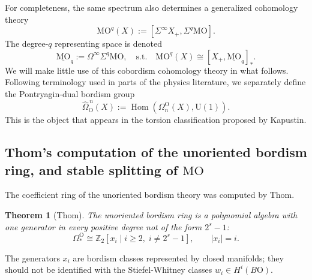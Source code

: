 \documentclass[aps,prx,reprint,superscriptaddress,twocolumn,amsmath,amssymb,amsfonts, nofootinbib]{revtex4-2}
\theoremstyle{apsstyle}
\newtheorem{theorem}{Theorem}[section]
\begin{document}
For completeness, the same spectrum also determines a generalized
cohomology theory
\begin{equation}
    \mathrm{MO}^{q}(X)
    :=
    \left[
        \Sigma^{\infty}X_{+},
        \Sigma^{q}\mathrm{MO}
    \right].
    \label{eq:MO_generalized_cohomology}
\end{equation}
The degree-$q$ representing space is denoted
\begin{equation}
\label{eq:MO_underlined_space}
    \underline{\mathrm{MO}}_{q}
    :=
    \Omega^{\infty}\Sigma^{q}\mathrm{MO},\quad \text{s.t.}\quad
    \mathrm{MO}^{q}(X)
    \cong
    \left[
        X_{+},
        \underline{\mathrm{MO}}_{q}
    \right]_{*}.
\end{equation}
We will make little use of this cobordism cohomology theory in what follows. Following terminology used in parts of the physics literature, we separately define the Pontryagin-dual bordism group
\begin{equation}
    \widehat{\Omega}_{\mathrm{O}}^{\,n}(X)
    :=
    \operatorname{Hom}\left(
        \Omega_{n}^{\mathrm{O}}(X),
        \mathrm{U}(1)
    \right).
    \label{eq:dual_bordism_group}
\end{equation}
This is the object that appears in the torsion classification proposed by Kapustin.


\subsection{Thom's computation of the unoriented bordism ring, and stable splitting of $\mathrm{MO}$}
\label{app:thom_unoriented_bordism}


The coefficient ring of the unoriented bordism theory was computed by Thom.

\begin{theorem}[Thom]
\label{thm:unoriented_bordism_ring}
The unoriented bordism ring is a polynomial algebra with one generator in every positive degree not of the form $2^{s}-1$:
\begin{equation}
    \Omega_{*}^{\mathrm O} \cong
    \mathbb Z_{2} [x_i\mid i\geq2,\; i\neq2^{s}-1],
    \qquad |x_i|=i.
    \label{eq:unoriented_bordism_polynomial}
\end{equation}
\end{theorem}

\noindent The generators $x_i$ are bordism classes represented by closed manifolds; they should not be identified with the Stiefel-Whitney classes $w_i\in H^i(B\mathrm O)$.
\end{document}
